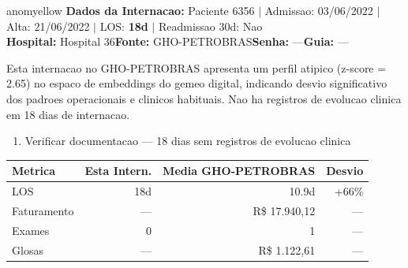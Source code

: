 \documentclass[a4paper,10pt]{article}
\begin{document}
\begin{anomalycard}[Internacao 6181 | GHO-PETROBRAS | MODERADO (z=2.65)]{anomyellow}
\textbf{Dados da Internacao:} Paciente 6356 $\mid$ Admissao: 03/06/2022 $\mid$ Alta: 21/06/2022 $\mid$ LOS: \textbf{18d} $\mid$ Readmissao 30d: Nao\\
\textbf{Hospital:} Hospital 36\quad\textbf{Fonte:} GHO-PETROBRAS\quad\textbf{Senha:} ---\quad\textbf{Guia:} ---\\
\vspace{2pt}\begin{tcolorbox}[colback=severityred!20,colframe=anomyellow,title={\textbf{Interpretacao de Negocio}},fonttitle=\bfseries\small,left=4pt,right=4pt,top=3pt,bottom=3pt]
{\small Esta internacao no GHO-PETROBRAS apresenta um perfil atipico (z-score = 2.65) no espaco de embeddings do gemeo digital, indicando desvio significativo dos padroes operacionais e clinicos habituais. Nao ha registros de evolucao clinica em 18 dias de internacao.}
\end{tcolorbox}
\begin{tcolorbox}[colback=severityyellow!30,colframe=anomorange,title={\textbf{Recomendacoes Especificas}},fonttitle=\bfseries\small,left=4pt,right=4pt,top=3pt,bottom=3pt]
\begin{enumerate}[nosep,leftmargin=16pt]
\item {\small Verificar documentacao --- 18 dias sem registros de evolucao clinica}
\end{enumerate}
\end{tcolorbox}
\begin{center}\begin{tabular}{l r r r}\toprule\textbf{Metrica} & \textbf{Esta Intern.} & \textbf{Media GHO-PETROBRAS} & \textbf{Desvio} \\\midrule
LOS & 18d & 10.9d & \textcolor{anomorange}{+66\%} \\
Faturamento & --- & R\$ 17.940,12 & --- \\
Exames & 0 & 1 & --- \\
Glosas & --- & R\$ 1.122,61 & --- \\
\bottomrule\end{tabular}\end{center}


\end{anomalycard}
\end{document}
